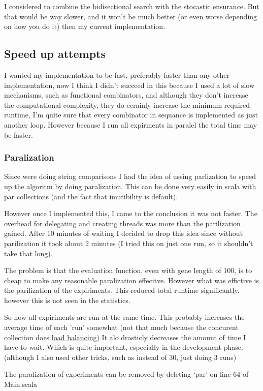\documentclass{article}
\begin{document}
I considered to combine the bidisectional search with the stocastic ensurance.
But that would be way slower, and it won't be much better (or even worse depending
on how you do it) then my current implementation.


\subsection{Speed up attempts}
I wanted my implementation to be fast, preferably faster than any other
implementation, now I think I didn't succeed in this because I used a
lot of slow mechanisms, such as functional combinators, and although
they don't increase the computational complexity, they do cerainly increase
the minimum required runtime, I'm quite sure that every combinator in sequance
is implemented as just another loop. However because I
run all expirments in paralel the total time may be faster.
\subsubsection{Paralization}
Since were doing string comparisons I had the idea of ussing parlization to
speed up the algoritm by doing paralization. This can be done very easily
in scala with par collections (and the fact that imutibility is default).

However once I implemented this, I came to the conclusion it was not faster.
The overhead for delegating and creating threads was more than the parilization
gained.  After 10 minutes of waiting I decided to drop this idea 
since without parilization it took about 2 minutes (I tried this
on just one run, so it shouldn't take that long).

The problem is that the evaluation function, even with gene length of 100, is
to cheap to make any reasonable paralization effecitve. However what was effictive
is the parilization of the expiriments. This reduced total runtime 
significantly. however this is not seen in the statistics.

So now all expiriments are run at the same time. This probably increases the
average time of each 'run' somewhat (not that much because the concurent
collection does \href{http://docs.scala-lang.org/overviews/parallel-collections/configuration.html}{load balancing})
It alo drasticly decreases the amount of time I have to wait. Which is quite
important, especially in the development phase. (although I also used
other tricks, such as instead of 30, just doing 3 runs)

The paralization of experiments can be removed by deleting `par' on line 64
of Main.scala
\end{document}
